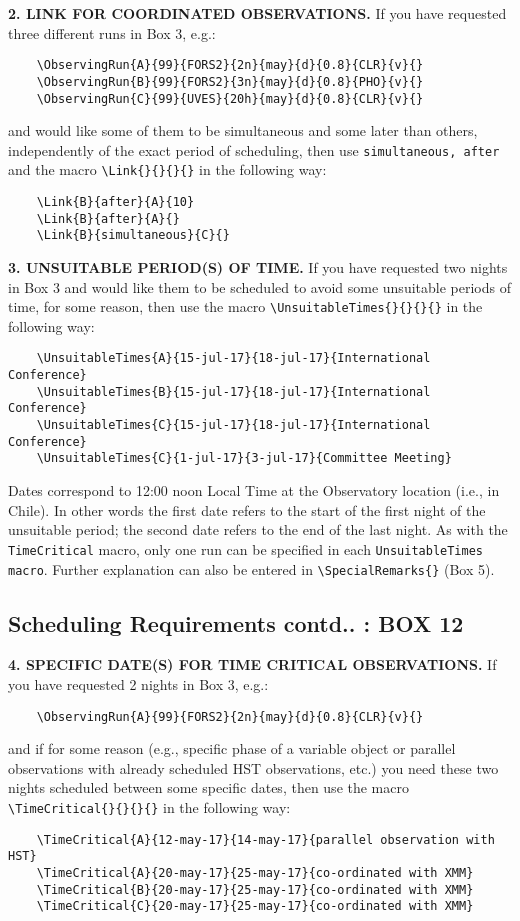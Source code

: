 \documentclass{article}
\begin{document}
\medskip

{\bf 2.  LINK FOR COORDINATED OBSERVATIONS.} If you have requested
three different runs in Box 3, e.g.:
\begin{verbatim}
    \ObservingRun{A}{99}{FORS2}{2n}{may}{d}{0.8}{CLR}{v}{}
    \ObservingRun{B}{99}{FORS2}{3n}{may}{d}{0.8}{PHO}{v}{}
    \ObservingRun{C}{99}{UVES}{20h}{may}{d}{0.8}{CLR}{v}{}
\end{verbatim}
and would like some of them to be simultaneous and some later than
others, independently of the exact period of scheduling, then use
\verb|simultaneous, after| and the macro \verb|\Link{}{}{}{}| in the
following way:
\begin{verbatim}
    \Link{B}{after}{A}{10}
    \Link{B}{after}{A}{}
    \Link{B}{simultaneous}{C}{}
\end{verbatim}

\medskip

{\bf 3. UNSUITABLE PERIOD(S) OF TIME.}  If you have requested two
nights in Box 3 and would like them to be scheduled to avoid some
unsuitable periods of time, for some reason, then use the macro
\verb|\UnsuitableTimes{}{}{}{}| in the following way:
\begin{verbatim}
    \UnsuitableTimes{A}{15-jul-17}{18-jul-17}{International Conference}
    \UnsuitableTimes{B}{15-jul-17}{18-jul-17}{International Conference}
    \UnsuitableTimes{C}{15-jul-17}{18-jul-17}{International Conference}
    \UnsuitableTimes{C}{1-jul-17}{3-jul-17}{Committee Meeting}
\end{verbatim}

Dates correspond to 12:00 noon Local Time at
the Observatory location (i.e., in Chile).
In other words the first date refers to the start of the first night
of the unsuitable period; the second date refers to the end of the last night.
As with the \verb|TimeCritical| macro, only one run can be specified in each
\verb|UnsuitableTimes macro|. 
Further explanation can also be entered in  \verb|\SpecialRemarks{}| (Box 5).

\subsection{Scheduling Requirements contd.. : {\bf BOX 12}}
\label{sec:timecrit}

{\bf 4. SPECIFIC DATE(S) FOR TIME CRITICAL  OBSERVATIONS.} If you have
requested 2 nights in Box 3, e.g.:
\begin{verbatim}
    \ObservingRun{A}{99}{FORS2}{2n}{may}{d}{0.8}{CLR}{v}{} 
\end{verbatim}
and if for some reason (e.g., specific phase of a variable object
or parallel observations with already scheduled HST observations,
etc.)  you need these two nights scheduled between some specific
dates, then use the macro \verb|\TimeCritical{}{}{}{}| in the
following way:
\begin{verbatim}
    \TimeCritical{A}{12-may-17}{14-may-17}{parallel observation with HST}
    \TimeCritical{A}{20-may-17}{25-may-17}{co-ordinated with XMM}     
    \TimeCritical{B}{20-may-17}{25-may-17}{co-ordinated with XMM}
    \TimeCritical{C}{20-may-17}{25-may-17}{co-ordinated with XMM}
\end{verbatim}
\end{document}
